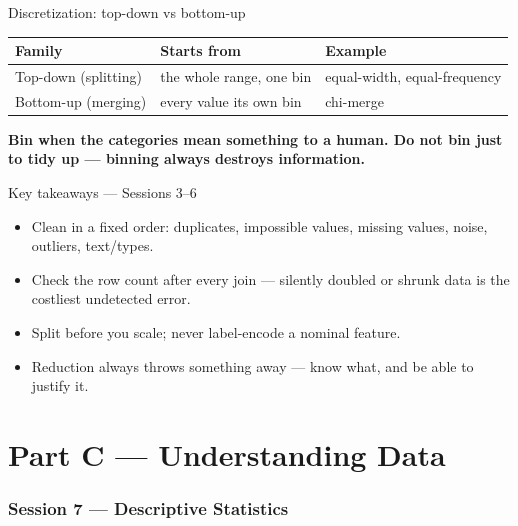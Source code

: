 \documentclass[10pt,aspectratio=169]{beamer}
\newcommand{\keyidea}[1]{%
  \begin{block}{}
  \centering\Large\bfseries\color{dsblue} #1
  \end{block}%
}
\begin{document}
\begin{frame}{Discretization: top-down vs bottom-up}
\begin{table}
\small
\begin{tabularx}{\linewidth}{@{}lXl@{}}
\toprule
\textbf{Family} & \textbf{Starts from} & \textbf{Example} \\
\midrule
Top-down (splitting) & the whole range, one bin & equal-width, equal-frequency \\
Bottom-up (merging) & every value its own bin & chi-merge \\
\bottomrule
\end{tabularx}
\end{table}
\keyidea{Bin when the categories mean something to a human. Do not bin just to tidy up --- binning always destroys information.}
\end{frame}

\begin{frame}{Key takeaways --- Sessions 3--6}
\begin{itemize}
\item Clean in a fixed order: duplicates, impossible values, missing values, noise, outliers, text/types.
\item Check the row count after every join --- silently doubled or shrunk data is the costliest undetected error.
\item Split before you scale; never label-encode a nominal feature.
\item Reduction always throws something away --- know what, and be able to justify it.
\end{itemize}
\end{frame}

\part{Part C --- Understanding Data}
\frame{\partpage}

\section{Session 7 --- Descriptive Statistics}
\end{document}

